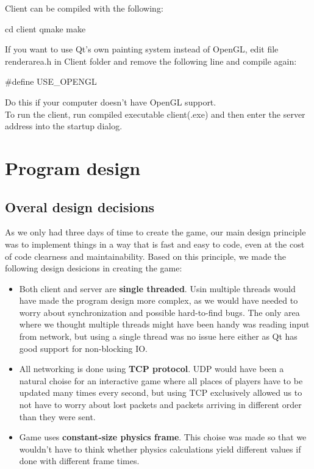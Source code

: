 \documentclass[a4paper,12pt,titlepage]{article}
\begin{document}
Client can be compiled with the following:
    \begin{verbatimtab}[3]
        cd client
        qmake
        make
    \end{verbatimtab}
If you want to use Qt's own painting system instead of OpenGL, edit file renderarea.h in Client folder and remove the following line and compile again: 
    \begin{verbatimtab}[3]
        #define USE_OPENGL
    \end{verbatimtab}
Do this if your computer doesn't have OpenGL support.\\
To run the client, run compiled executable client(.exe) and then enter the server address into the startup dialog.

\section{Program design}

\subsection{Overal design decisions}

As we only had three days of time to create the game, our main design principle was to implement things in a way that is fast and easy to code, even at the cost of code clearness and maintainability. Based on this principle, we made the following design desicions in creating the game:
\begin{itemize}
\item Both client and server are \textbf{single threaded}. Usin multiple threads would have made the program design more complex, as we would have needed to worry about synchronization and possible hard-to-find bugs. The only area where we thought multiple threads might have been handy was reading input from network, but using a single thread was no issue here either as Qt has good support for non-blocking IO.
\item All networking is done using \textbf{TCP protocol}. UDP would have been a natural choise for an interactive game where all places of players have to be updated many times every second, but using TCP exclusively allowed us to not have to worry about lost packets and packets arriving in different order than they were sent.
\item Game uses \textbf{constant-size physics frame}. This choise was made so that we wouldn't have to think whether physics calculations yield different values if done with different frame times.
\end{itemize}
\end{document}
